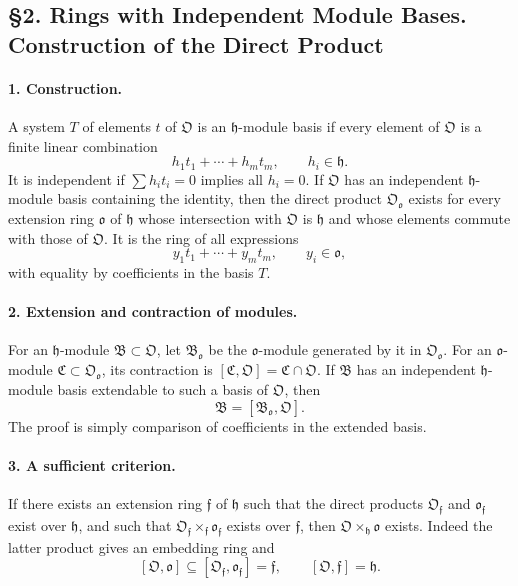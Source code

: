 \documentclass[11pt]{article}
\begin{document}
\subsection*{§2. Rings with Independent Module Bases. Construction of the Direct Product}

\paragraph{1. Construction.}
A system $T$ of elements $t$ of $\mathfrak O$ is an $\mathfrak h$-module basis if every element of $\mathfrak O$ is a finite linear combination
\[
        h_1t_1+\cdots+h_mt_m,
        \qquad h_i\in\mathfrak h.
\]
It is independent if $\sum h_it_i=0$ implies all $h_i=0$. If $\mathfrak O$ has an independent $\mathfrak h$-module basis containing the identity, then the direct product $\mathfrak O_{\mathfrak o}$ exists for every extension ring $\mathfrak o$ of $\mathfrak h$ whose intersection with $\mathfrak O$ is $\mathfrak h$ and whose elements commute with those of $\mathfrak O$. It is the ring of all expressions
\[
        y_1t_1+\cdots+y_mt_m,
        \qquad y_i\in\mathfrak o,
\]
with equality by coefficients in the basis $T$.

\paragraph{2. Extension and contraction of modules.}
For an $\mathfrak h$-module $\mathfrak B\subset\mathfrak O$, let $\mathfrak B_{\mathfrak o}$ be the $\mathfrak o$-module generated by it in $\mathfrak O_{\mathfrak o}$. For an $\mathfrak o$-module $\mathfrak C\subset\mathfrak O_{\mathfrak o}$, its contraction is $[\mathfrak C,\mathfrak O]=\mathfrak C\cap\mathfrak O$. If $\mathfrak B$ has an independent $\mathfrak h$-module basis extendable to such a basis of $\mathfrak O$, then
\[
        \mathfrak B=[\mathfrak B_{\mathfrak o},\mathfrak O].
\]
The proof is simply comparison of coefficients in the extended basis.

\paragraph{3. A sufficient criterion.}
If there exists an extension ring $\mathfrak f$ of $\mathfrak h$ such that the direct products $\mathfrak O_{\mathfrak f}$ and $\mathfrak o_{\mathfrak f}$ exist over $\mathfrak h$, and such that $\mathfrak O_{\mathfrak f}\times_{\mathfrak f}\mathfrak o_{\mathfrak f}$ exists over $\mathfrak f$, then $\mathfrak O\times_{\mathfrak h}\mathfrak o$ exists. Indeed the latter product gives an embedding ring and
\[
        [\mathfrak O,\mathfrak o]\subseteq [\mathfrak O_{\mathfrak f},\mathfrak o_{\mathfrak f}]=\mathfrak f,
        \qquad [\mathfrak O,\mathfrak f]=\mathfrak h.
\]
\end{document}
